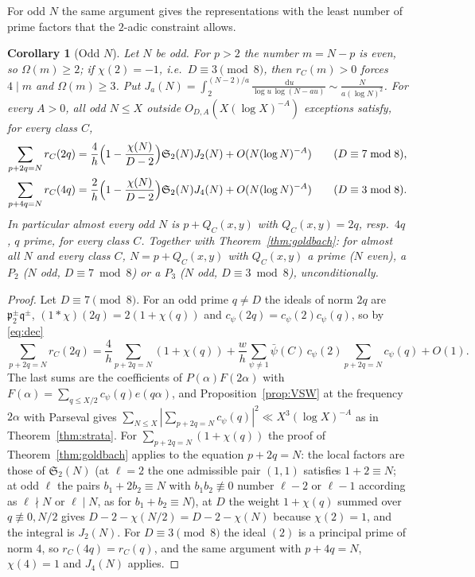 \documentclass[11pt]{amsart}
\newtheorem{corollary}[theorem]{Corollary}
\theoremstyle{remark}
\newcommand{\sS}{\mathfrak S}
\newcommand{\dd}{\,\mathrm d}
\begin{document}
For odd $N$ the same argument gives the representations with the least number of prime factors that the $2$-adic constraint allows.

\begin{corollary}[Odd $N$]\label{cor:odd}
Let $N$ be odd. For $p>2$ the number $m=N-p$ is even, so $\Omega(m)\ge2$; if $\chi(2)=-1$, i.e.\ $D\equiv3\pmod8$, then $r_C(m)>0$ forces $4\mid m$ and $\Omega(m)\ge3$. Put $J_a(N)=\int_2^{(N-2)/a}\frac{\dd u}{\log u\,\log(N-au)}\sim\frac N{a(\log N)^2}$. For every $A>0$, all odd $N\le X$ outside $O_{D,A}(X(\log X)^{-A})$ exceptions satisfy, for every class $C$,
\begin{align*}
\sum_{p+2q=N}r_C(2q)&=\frac4h\Bigl(1-\frac{\chi(N)}{D-2}\Bigr)\sS_2(N)J_2(N)+O(N(\log N)^{-A})\qquad(D\equiv7\bmod8),\\
\sum_{p+4q=N}r_C(4q)&=\frac2h\Bigl(1-\frac{\chi(N)}{D-2}\Bigr)\sS_2(N)J_4(N)+O(N(\log N)^{-A})\qquad(D\equiv3\bmod8).
\end{align*}
In particular almost every odd $N$ is $p+Q_C(x,y)$ with $Q_C(x,y)=2q$, resp.\ $4q$, $q$ prime, for every class $C$. Together with Theorem~\ref{thm:goldbach}: for almost all $N$ and every class $C$, $N=p+Q_C(x,y)$ with $Q_C(x,y)$ a prime ($N$ even), a $P_2$ ($N$ odd, $D\equiv7\bmod8$) or a $P_3$ ($N$ odd, $D\equiv3\bmod8$), unconditionally.
\end{corollary}
\begin{proof}
Let $D\equiv7\pmod8$. For an odd prime $q\ne D$ the ideals of norm $2q$ are $\mathfrak p_2^{\pm}\mathfrak q^{\pm}$, $(1*\chi)(2q)=2(1+\chi(q))$ and $c_\psi(2q)=c_\psi(2)c_\psi(q)$, so by \eqref{eq:dec}
\[
\sum_{p+2q=N}r_C(2q)=\frac4h\sum_{p+2q=N}(1+\chi(q))+\frac wh\sum_{\psi\ne1}\bar\psi(C)\,c_\psi(2)\sum_{p+2q=N}c_\psi(q)+O(1).
\]
The last sums are the coefficients of $P(\alpha)F(2\alpha)$ with $F(\alpha)=\sum_{q\le X/2}c_\psi(q)e(q\alpha)$, and Proposition~\ref{prop:VSW} at the frequency $2\alpha$ with Parseval gives $\sum_{N\le X}|\sum_{p+2q=N}c_\psi(q)|^2\ll X^3(\log X)^{-A}$ as in Theorem~\ref{thm:strata}. For $\sum_{p+2q=N}(1+\chi(q))$ the proof of Theorem~\ref{thm:goldbach} applies to the equation $p+2q=N$: the local factors are those of $\sS_2(N)$ (at $\ell=2$ the one admissible pair $(1,1)$ satisfies $1+2\equiv N$; at odd $\ell$ the pairs $b_1+2b_2\equiv N$ with $b_1b_2\not\equiv0$ number $\ell-2$ or $\ell-1$ according as $\ell\nmid N$ or $\ell\mid N$, as for $b_1+b_2\equiv N$), at $D$ the weight $1+\chi(q)$ summed over $q\not\equiv0,N/2$ gives $D-2-\chi(N/2)=D-2-\chi(N)$ because $\chi(2)=1$, and the integral is $J_2(N)$. For $D\equiv3\pmod8$ the ideal $(2)$ is a principal prime of norm $4$, so $r_C(4q)=r_C(q)$, and the same argument with $p+4q=N$, $\chi(4)=1$ and $J_4(N)$ applies.
\end{proof}
\end{document}
